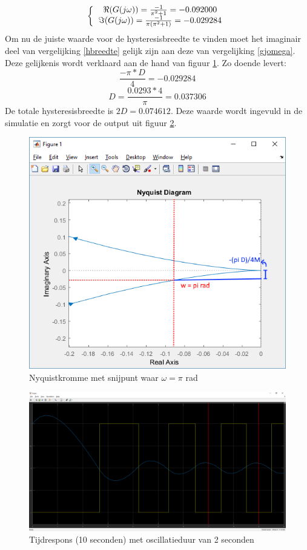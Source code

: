 \documentclass[12pt]{article}
\begin{document}
\[ 
\left \{
  \begin{tabular}{c}
  $\Re(G(j\omega)) = \frac{-1}{\pi^2+1} = -0.092000$ \\
  $\Im(G(j\omega)) = \frac{-1}{\pi(\pi^2+1)} = -0.029284$ \\
  \end{tabular}
\right. 
\]
Om nu de juiste waarde voor de hysteresisbreedte te vinden moet het imaginair deel van vergelijking \ref{hbreedte} gelijk zijn aan deze van vergelijking \ref{gjomega}. Deze gelijkenis wordt verklaard aan de hand van figuur \ref{nyq}. Zo doende levert:
\begin{equation}
	\frac{-\pi * D}{4} = -0.029284
\end{equation}
\begin{equation}
	D = \frac{0.0293*4}{\pi} = 0.037306
\end{equation}
De totale hysteresisbreedte is $2D = 0.074612$. Deze waarde wordt ingevuld in de simulatie en zorgt voor de output uit figuur \ref{output3}.
\begin{figure}
	\centering
	\includegraphics[height=0.4\textheight, keepaspectratio]{nyquist.png}
	\caption{Nyquistkromme met snijpunt waar $\omega = \pi$ rad}
	\label{nyq}
\end{figure}
\begin{figure}[]
	\centering
	\includegraphics[width=\textwidth, keepaspectratio]{output3.png}
	\caption{Tijdrespons (10 seconden) met oscillatieduur van 2 seconden}
	\label{output3}
\end{figure}
\end{document}
